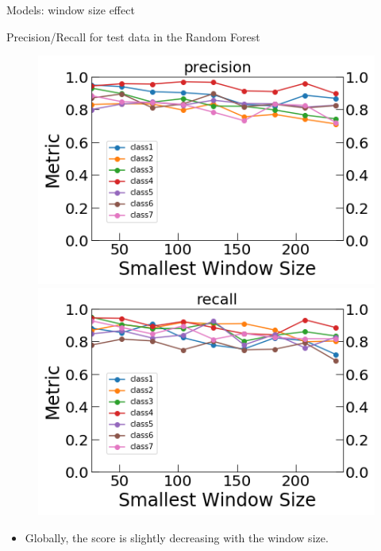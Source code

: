 \documentclass{if-beamer}
\begin{document}
\begin{frame}{Models: window size effect} 
    \begin{exampleblock}{Precision/Recall for test data in the Random Forest}
             \begin{figure}
            \includegraphics[scale=0.3]{./figs/Precision_Test_Ovlp_Window_Size.png}
            \includegraphics[scale=0.3]{./figs/Recall_Test_Ovlp_Window_Size.png}
            \end{figure}
        \end{exampleblock}      
        
        \begin{itemize}
        \item Globally, the score is slightly decreasing with the window size.
        \end{itemize}
        
   \end{frame}
\end{document}
